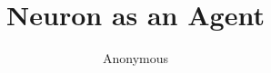 \documentclass{article} %
\title{Neuron as an Agent}
\author{Anonymous}
\begin{document}
\maketitle

\begin{abstract}
\end{abstract}












\end{document}

